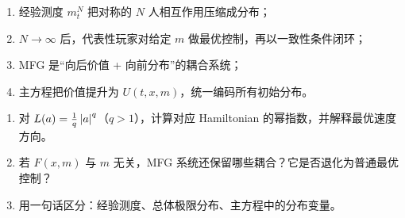 \begin{takeaway}
\begin{enumerate}
  \item 经验测度 $m_t^N$ 把对称的 $N$ 人相互作用压缩成分布；
  \item $N\to\infty$ 后，代表性玩家对给定 $m$ 做最优控制，再以一致性条件闭环；
  \item MFG 是“向后价值 + 向前分布”的耦合系统；
  \item 主方程把价值提升为 $U(t,x,m)$，统一编码所有初始分布。
\end{enumerate}
\end{takeaway}

\begin{exercisebox}
\begin{enumerate}
  \item 对 $L(a)=\tfrac{1}{q}\left\lvert a\right\rvert^q$（$q>1$），计算对应 Hamiltonian 的幂指数，并解释最优速度方向。
  \item 若 $F(x,m)$ 与 $m$ 无关，MFG 系统还保留哪些耦合？它是否退化为普通最优控制？
  \item 用一句话区分：经验测度、总体极限分布、主方程中的分布变量。
\end{enumerate}
\end{exercisebox}
